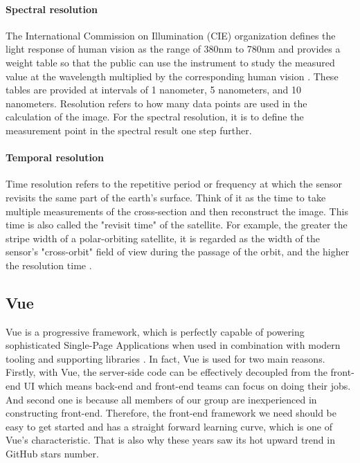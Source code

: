 \documentclass[conference]{IEEEtran}
\begin{document}
\paragraph{Spectral resolution} 
    
The International Commission on Illumination (CIE) organization defines the light response of human vision as the range of 380nm to 
780nm and provides a weight table so that the public can use the instrument to study the measured value at the wavelength multiplied 
by the corresponding human vision \cite{spectral41:online}. These tables are provided at intervals of 1 nanometer, 5 nanometers, 
and 10 nanometers. Resolution refers to how many data points are used in the calculation of the image. For the spectral resolution, 
it is to define the measurement point in the spectral result one step further.

\paragraph{Temporal resolution} 
    
Time resolution refers to the repetitive period or frequency at which the sensor revisits the same part of the earth's 
surface. Think of it as the time to take multiple measurements of the cross-section and then reconstruct the image. This 
time is also called the "revisit time" of the satellite. For example, the greater the stripe width of a polar-orbiting 
satellite, it is regarded as the width of the sensor's "cross-orbit" field of view during the passage of the orbit, and 
the higher the resolution time \cite{Topic43:online}.


\subsection{Vue}

Vue is a progressive framework, which is perfectly capable of powering sophisticated Single-Page Applications when used 
in combination with modern tooling and supporting libraries \cite{Introduc89:online}. In fact, Vue is used for two main reasons. Firstly, 
with Vue, the server-side code can be effectively decoupled from the front-end UI which means back-end and front-end 
teams can focus on doing their jobs. And second one is because all members of our group are inexperienced in constructing 
front-end. Therefore, the front-end framework we need should be easy to get started and has a straight forward learning 
curve, which is one of Vue’s characteristic. That is also why these years saw its hot upward trend in GitHub stars number.
\end{document}
